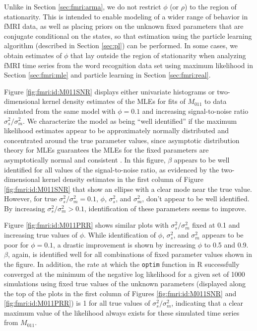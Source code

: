 Unlike in Section \ref{sec:fmri:arma}, we do not restrict $\phi$ (or $\rho$) to the region of stationarity. This is intended to enable modeling of a wider range of behavior in fMRI data, as well as placing priors on the unknown fixed parameters that are conjugate conditional on the states, so that estimation using the particle learning algorithm (described in Section \ref{sec:pl}) can be performed. In some cases, we obtain estimates of $\phi$ that lay outside the region of stationarity when analyzing fMRI time series from the word recognition data set using maximum likelihood in Section \ref{sec:fmri:mle} and particle learning in Section \ref{sec:fmri:real}.

Figure \ref{fig:fmri:id:M011SNR} displays either univariate histograms or two-dimensional kernel density estimates \citep{wand2006kernsmooth} of the MLEs for fits of $M_{011}$ to data simulated from the same model with $\phi = 0.1$ and increasing signal-to-noise ratio $\sigma^2_s / \sigma^2_m$. We characterize the model as being ``well identified'' if the maximum likelihood estimates appear to be approximately normally distributed and concentrated around the true parameter values, since asymptotic distribution theory for MLEs guarantees the MLEs for the fixed parameters are asymptotically normal and consistent \citep[Section 10.1]{casella:berger:2002}. In this figure, $\beta$ appears to be well identified for all values of the signal-to-noise ratio, as evidenced by the two-dimensional kernel density estimates in the first column of Figure \ref{fig:fmri:id:M011SNR} that show an ellipse with a clear mode near the true value. However, for true $\sigma^2_s / \sigma^2_m = 0.1$, $\phi$, $\sigma^2_s$, and $\sigma^2_m$, don't appear to be well identified. By increasing $\sigma^2_s / \sigma^2_m > 0.1$, identification of these parameters seems to improve.

Figure \ref{fig:fmri:id:M011PRR} shows similar plots with $\sigma^2_s / \sigma^2_m$ fixed at 0.1 and increasing true values of $\phi$. While identification of $\phi$, $\sigma^2_s$, and $\sigma^2_m$ appears to be poor for $\phi = 0.1$, a drastic improvement is shown by increasing $\phi$ to 0.5 and 0.9. $\beta$, again, is identified well for all combinations of fixed parameter values shown in the figure. In addition, the rate at which the {\tt optim} function in R successfully converged at the minimum of the negative log likelihood for a given set of 1000 simulations using fixed true values of the unknown parameters (displayed along the top of the plots in the first column of Figures \ref{fig:fmri:id:M011SNR} and \ref{fig:fmri:id:M011PRR}) is 1 for all true values of $\sigma^2_s / \sigma^2_m$, indicating that a clear maximum value of the likelihood always exists for these simulated time series from $M_{011}$.

